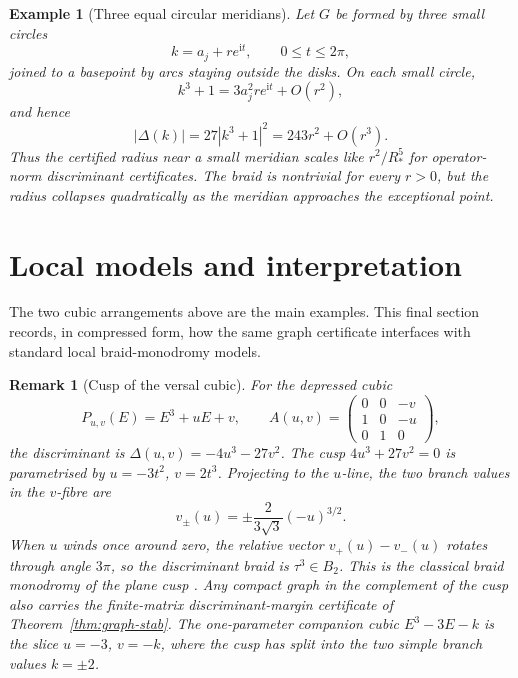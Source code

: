\documentclass[11pt]{article}
\newtheorem{example}[theorem]{Example}
\newtheorem{remark}[theorem]{Remark}
\numberwithin{equation}{section}
\newcommand{\abs}[1]{\left|#1\right|}
\newcommand{\ii}{\mathrm i}
\begin{document}
\begin{example}[Three equal circular meridians]
Let $G$ be formed by three small circles
\[
  k=a_j+re^{\ii t},\qquad 0\le t\le2\pi,
\]
joined to a basepoint by arcs staying outside the disks.  On each small
circle,
\[
  k^3+1=3a_j^2re^{\ii t}+O(r^2),
\]
and hence
\[
  \abs{\Delta(k)}=27\abs{k^3+1}^2
  =243r^2+O(r^3).
\]
Thus the certified radius near a small meridian scales like $r^2/R_*^5$ for
operator-norm discriminant certificates.  The braid is nontrivial for every
$r>0$, but the radius collapses quadratically as the meridian approaches the
exceptional point.
\end{example}


\section{Local models and interpretation}\label{sec:local-models}

The two cubic arrangements above are the main examples.  This final section
records, in compressed form, how the same graph certificate interfaces with
standard local braid-monodromy models.

\begin{remark}[Cusp of the versal cubic]\label{rem:cusp}
For the depressed cubic
\[
  P_{u,v}(E)=E^3+uE+v,
  \qquad
  A(u,v)=\begin{pmatrix}0&0&-v\\1&0&-u\\0&1&0\end{pmatrix},
\]
the discriminant is \(\Delta(u,v)=-4u^3-27v^2\).  The cusp
\(4u^3+27v^2=0\) is parametrised by \(u=-3t^2\), \(v=2t^3\).  Projecting
to the \(u\)-line, the two branch values in the \(v\)-fibre are
\[
  v_\pm(u)=\pm \frac{2}{3\sqrt3}(-u)^{3/2}.
\]
When \(u\) winds once around zero, the relative vector
\(v_+(u)-v_-(u)\) rotates through angle \(3\pi\), so the discriminant braid
is \(\tau^3\in B_2\).  This is the classical braid monodromy of the plane
cusp \cite{BrieskornKnoerrer1986,MoishezonTeicher1988}.  Any compact graph in
the complement of the cusp also carries the finite-matrix
discriminant-margin certificate of Theorem~\ref{thm:graph-stab}.
The one-parameter companion cubic \(E^3-3E-k\) is the slice \(u=-3\),
\(v=-k\), where the cusp has split into the two simple branch values
\(k=\pm2\).
\end{remark}
\end{document}
